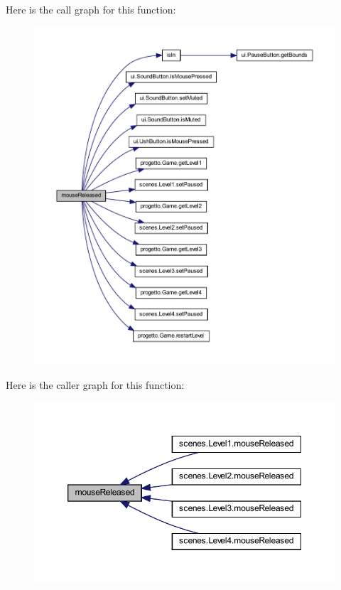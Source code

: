 Here is the call graph for this function\+:\nopagebreak
\begin{figure}[H]
\begin{center}
\leavevmode
\includegraphics[width=350pt]{classui_1_1_pause_overlay_a87a07291794e15052db67f945d90853e_cgraph}
\end{center}
\end{figure}
Here is the caller graph for this function\+:\nopagebreak
\begin{figure}[H]
\begin{center}
\leavevmode
\includegraphics[width=350pt]{classui_1_1_pause_overlay_a87a07291794e15052db67f945d90853e_icgraph}
\end{center}
\end{figure}
\mbox{\label{classui_1_1_pause_overlay_a4506144774b5a18385cf2eb0f4ff5e42}} 
